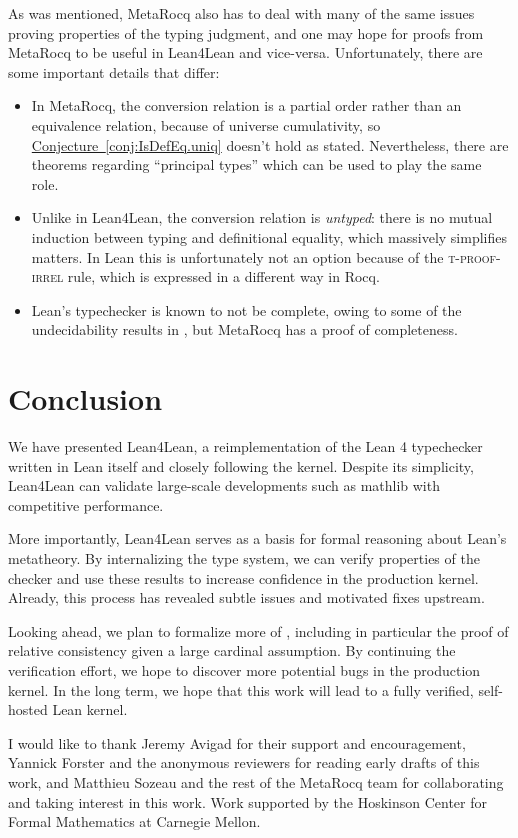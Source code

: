 \documentclass[sigplan,10pt,screen]{acmart}\settopmatter{printfolios=true,printccs=false,printacmref=false}
\newcommand{\lfl}{\textsf{Lean4Lean}\xspace}
\newcommand{\sref}[2]{\hyperref[#2]{#1~\ref{#2}}}
\begin{document}
As was mentioned, MetaRocq also has to deal with many of the same issues proving properties of the typing judgment, and one may hope for proofs from MetaRocq to be useful in \lfl and vice-versa. Unfortunately, there are some important details that differ:
\begin{itemize}
  \item In MetaRocq, the conversion relation is a partial order rather than an equivalence relation, because of universe cumulativity, so \sref{Conjecture}{conj:IsDefEq.uniq} doesn't hold as stated. Nevertheless, there are theorems regarding ``principal types'' which can be used to play the same role.
  \item Unlike in \lfl, the conversion relation is \emph{untyped}: there is no mutual induction between typing and definitional equality, which massively simplifies matters. In Lean this is unfortunately not an option because of the \textsc{t-proof-irrel} rule, which is expressed in a different way in Rocq.
  \item Lean's typechecker is known to not be complete, owing to some of the undecidability results in \cite{leantt}, but MetaRocq \cite{sozeau23,lennonbertrandphd} has a proof of completeness.
\end{itemize}

\section{Conclusion}\label{sec:conclusion}

We have presented \lfl, a reimplementation of the Lean 4 typechecker written in Lean itself and closely following the kernel. Despite its simplicity, \lfl can validate large-scale developments such as \textsf{mathlib} with competitive performance.

More importantly, \lfl serves as a basis for formal reasoning about Lean’s metatheory. By internalizing the type system, we can verify properties of the checker and use these results to increase confidence in the production kernel. Already, this process has revealed subtle issues and motivated fixes upstream.

Looking ahead, we plan to formalize more of \cite{leantt}, including in particular the proof of relative consistency given a large cardinal assumption. By continuing the verification effort, we hope to discover more potential bugs in the production kernel. In the long term, we hope that this work will lead to a fully verified, self-hosted Lean kernel.

\begin{acks}
I would like to thank Jeremy Avigad for their support and encouragement, Yannick Forster and the anonymous reviewers for reading early drafts of this work, and Matthieu Sozeau and the rest of the MetaRocq team for collaborating and taking interest in this work. Work supported by the Hoskinson Center for Formal Mathematics at Carnegie Mellon.
\end{acks}




\end{document}
